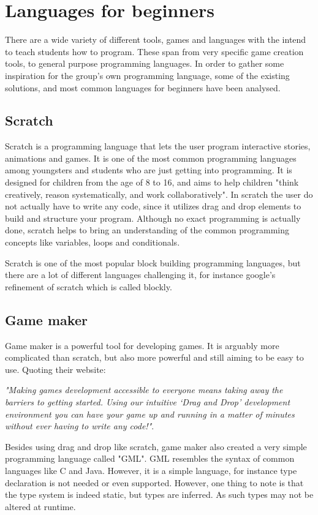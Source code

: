 \section{Languages for beginners}

There are a wide variety of different tools, games and languages with the intend to teach students how to program. 
These span from very specific game creation tools, to general purpose programming languages. 
In order to gather some inspiration for the group's own programming language, some of the existing solutions, and most common languages for beginners have been analysed.

\subsection{Scratch}
\label{sec:scratch}
Scratch is a programming language that lets the user program interactive stories, animations and games. 
It is one of the most common programming languages among youngsters and students who are just getting into programming. 
It is designed for children from the age of 8 to 16, and aims to help children "think creatively, reason systematically, and work collaboratively". 
In scratch the user do not actually have to write any code, since it utilizes drag and drop elements to build and structure your program. 
Although no exact programming is actually done, scratch helps to bring an understanding of the common programming concepts like variables, loops and conditionals.\cite{ScratchWebsite}

Scratch is one of the most popular block building programming languages, but there are a lot of different languages challenging it, for instance google's refinement of scratch which is called blockly.\cite{Blockly}

\subsection{Game maker}
Game maker is a powerful tool for developing games. 
It is arguably more complicated than scratch, but also more powerful and still aiming to be easy to use. 
Quoting their website: 

\textit{"Making games development accessible to everyone means taking away the barriers to getting started. 
Using our intuitive ‘Drag and Drop’ development environment you can have your game up and running in a matter of minutes without ever having to write any code!"}.
\cite{GameMaker}
 
Besides using drag and drop like scratch, game maker also created a very simple programming language called "GML".
GML resembles the syntax of common languages like C and Java. 
However, it is a simple language, for instance type declaration is not needed or even supported. 
However, one thing to note is that the type system is indeed static, but types are inferred. 
As such types may not be altered at runtime.\cite{GML}

